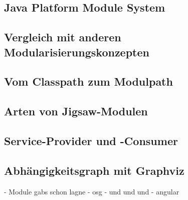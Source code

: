 \subsection{Java Platform Module System}

\subsection{Vergleich mit anderen Modularisierungskonzepten}

\subsection{Vom Classpath zum Modulpath}

\subsection{Arten von Jigsaw-Modulen}

\subsection{Service-Provider und -Consumer}

\subsection{Abhängigkeitsgraph mit Graphviz}


- Module gabs schon lagne 
- osg 
- und und und 
- angular 
